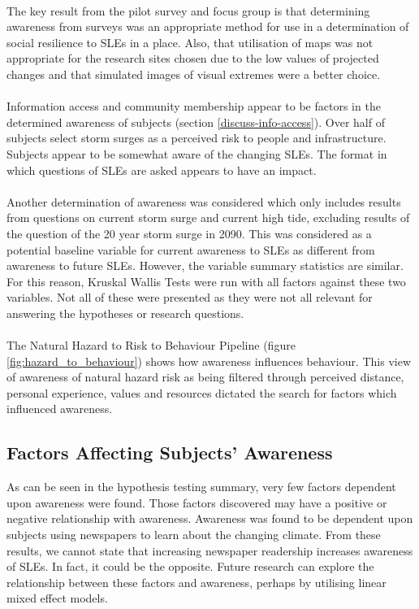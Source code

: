 \paragraph{}
The key result from the pilot survey and focus group is that determining awareness from surveys was an appropriate method for use in a determination of social resilience to SLEs in a place. Also, that utilisation of maps was not appropriate for the research sites chosen due to the low values of projected changes and that simulated images of visual extremes were a better choice.
\paragraph{}
Information access and community membership appear to be factors in the determined awareness of subjects (section \ref{discuss-info-access}). Over half of subjects select storm surges as a perceived risk to people and infrastructure. Subjects appear to be somewhat aware of the changing SLEs. The format in which questions of SLEs are asked appears to have an impact. 


\paragraph{}
Another determination of awareness was considered which only includes results from questions on current storm surge and current high tide, excluding results of the question of the 20 year storm surge in 2090. This was considered as a potential baseline variable for current awareness to SLEs as different from awareness to future SLEs. However, the variable summary statistics are similar. For this reason, Kruskal Wallis Tests were run with all factors against these two variables. Not all of these were presented as they were not all relevant for answering the hypotheses or research questions. 

\paragraph{}
The Natural Hazard to Risk to Behaviour Pipeline (figure \ref{fig:hazard_to_behaviour}) shows how awareness influences behaviour. This view of awareness of natural hazard risk as being filtered through perceived distance, personal experience, values and resources dictated the search for factors which influenced awareness. 



\subsection{Factors Affecting Subjects' Awareness}
As can be seen in the hypothesis testing summary, very few factors dependent upon awareness were found. Those factors discovered may have a positive or negative relationship with awareness. Awareness was found to be dependent upon subjects using newspapers to learn about the changing climate. From these results, we cannot state that increasing newspaper readership increases awareness of SLEs. In fact, it could be the opposite. Future research can explore the relationship between these factors and awareness, perhaps by utilising linear mixed effect models.
